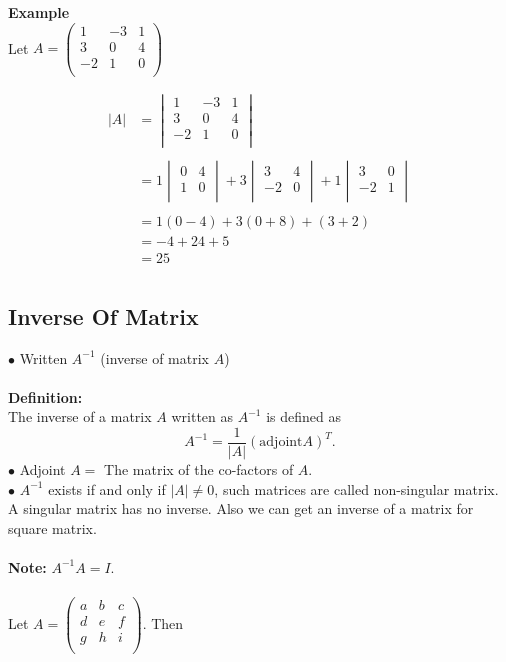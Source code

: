 \documentclass[11pt,a4paper]{article}
\begin{document}
\textbf{Example}\\
Let $A=
\begin{pmatrix}
1 & -3 & 1\\
3 & 0 & 4\\
-2 & 1 & 0\\
\end{pmatrix}
$

\begin{align*}
|A| & =
\begin{vmatrix}
1 & -3 & 1\\
3 & 0 & 4\\
-2 & 1 & 0\\
\end{vmatrix}\\\\
& = 1
\begin{vmatrix}
0 & 4\\
1 & 0\\
\end{vmatrix}
+3
\begin{vmatrix}
3 & 4\\
-2 & 0\\
\end{vmatrix}
+1
\begin{vmatrix}
3 & 0\\
-2 & 1\\
\end{vmatrix}\\\\
& = 1 (0-4)+3(0+8)+(3+2)\\
& = -4+24+5\\
& = 25\\
\end{align*}



\subsection{Inverse Of Matrix}
$\bullet$ Written $A^{-1}$ (inverse of matrix $A$)\\\\
\textbf{Definition:}\\
The inverse of a matrix $A$ written as $A^{-1}$ is defined as $$ A^{-1}=\frac{1}{|A|}(\text{adjoint}A)^T.$$
$\bullet$ Adjoint $A=$ The matrix of the co-factors of $A$.\\
$\bullet$ $A^{-1}$ exists if and only if $|A|\neq 0$, such matrices are called non-singular matrix. A singular matrix has no inverse. Also we can get an inverse of a matrix for square matrix.\\\\
\textbf{Note:} $A^{-1}A=I.$\\\\
Let $A=
\begin{pmatrix}
a & b & c\\
d & e & f\\
g & h & i\\
\end{pmatrix}
$. Then \\
\end{document}
